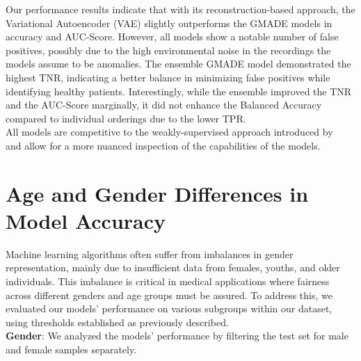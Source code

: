 Our performance results indicate that with its reconstruction-based approach, the Variational Autoencoder (VAE) slightly outperforms the GMADE models in accuracy and AUC-Score. However, all models show a notable number of false positives, possibly due to the high environmental noise in the recordings the models assume to be anomalies. The ensemble GMADE model demonstrated the highest TNR, indicating a better balance in minimizing false positives while identifying healthy patients. Interestingly, while the ensemble improved the TNR and the AUC-Score marginally, it did not enhance the Balanced Accuracy compared to individual orderings due to the lower TPR.\\
All models are competitive to the weakly-supervised approach introduced by~\cite{cozzatti2022variational} and allow for a more nuanced inspection of the capabilities of the models.
\section{Age and Gender Differences in Model Accuracy}
Machine learning algorithms often suffer from imbalances in gender representation, mainly due to insufficient data from females, youths, and older individuals. This imbalance is critical in medical applications where fairness across different genders and age groups must be assured. To address this, we evaluated our models' performance on various subgroups within our dataset, using thresholds established as previously described.\\
\textbf{Gender}: We analyzed the models' performance by filtering the test set for male and female samples separately.


